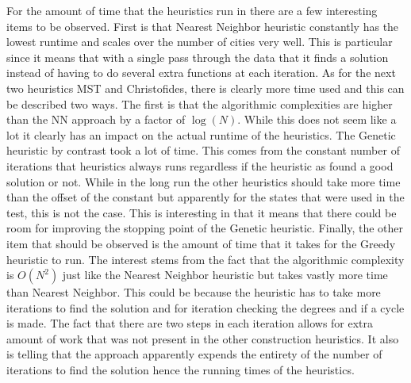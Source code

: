\documentclass[midd]{thesis}
\newcommand{\tab}{\hspace*{2em}}
\begin{document}
\tab For the amount of time that the heuristics run in there are a few interesting items to be observed. First is that Nearest Neighbor heuristic constantly has the lowest runtime and scales over the number of cities very well. This is particular since it means that with a single pass through the data that it finds a solution instead of having to do several extra functions at each iteration. As for the next two heuristics MST and Christofides, there is clearly more time used and this can be described two ways. The first is that the algorithmic complexities are higher than the NN approach by a factor of $\log(N)$. While this does not seem like a lot it clearly has an impact on the actual runtime of the heuristics. The Genetic heuristic by contrast took a lot of time. This comes from the constant number of iterations that heuristics always runs regardless if the heuristic as found a good solution or not. While in the long run the other heuristics should take more time than the offset of the constant but apparently for the states that were used in the test, this is not the case. This is interesting in that it means that there could be room for improving the stopping point of the Genetic heuristic. Finally, the other item that should be observed is the amount of time that it takes for the Greedy heuristic to run. The interest stems from the fact that the algorithmic complexity is $O(N^2)$ just like the Nearest Neighbor heuristic but takes vastly more time than Nearest Neighbor. This could be because the heuristic has to take more iterations to find the solution and for iteration checking the degrees and if a cycle is made. The fact that there are two steps in each iteration allows for extra amount of work that was not present in the other construction heuristics. It also is telling that the approach apparently expends the entirety of the number of iterations to find the solution hence the running times of the heuristics.\\
\end{document}
